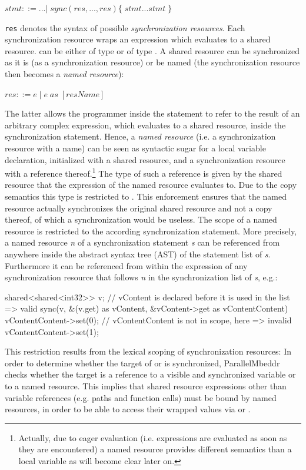$ \mathit{stmt} ::= ...
        |\;\mathit{sync}(res, ..., res) \{\;\mathit{stmt} ... \mathit{stmt}\;\}$
        
\texttt{res} denotes the syntax of possible \textit{synchronization resources}. Each synchronization resource  wraps an expression  which evaluates to a shared resource.  can be either of type  or of type . A shared resource can be synchronized as it is (as a synchronization resource) or be named (the synchronization resource then becomes a \textit{named resource}):

$ res ::= e\;|\;e\;\mathit{as}\;[\mathit{resName}] $

The latter allows the programmer inside the  statement to refer to the result of an arbitrary complex expression, which evaluates to a shared resource, inside the synchronization statement. Hence, a \textit{named resource} (i.e. a synchronization resource with a name) can be seen as syntactic sugar for a local variable declaration, initialized with a shared resource, and a synchronization resource with a reference thereof.\footnote{Actually, due to eager evaluation (i.e. expressions are evaluated as soon as they are encountered) a named resource provides different semantics than a local variable as will become clear later on.} The type of such a reference is given by the shared resource that the expression of the named resource evaluates to. Due to the copy semantics this type is restricted to . This enforcement ensures that the named resource actually synchronizes the original shared resource and not a copy thereof, of which a synchronization would be useless. The scope of a named resource is restricted to the according synchronization statement. More precisely, a named resource \textit{n} of a synchronization statement \textit{s} can be referenced from anywhere inside the abstract syntax tree (AST) of the statement list of \textit{s}. Furthermore it can be referenced from within the expression of any synchronization resource that follows \textit{n} in the synchronization list of \textit{s}, e.g.:
\begin{ccode}
shared<shared<int32>> v;
// vContent is declared before it is used in the list => valid
sync(v, &(v.get) as vContent, &vContent->get as vContentContent) {
  vContentContent->set(0);
}
// vContentContent is not in scope, here => invalid
vContentContent->set(1);
\end{ccode}

This restriction results from the lexical scoping of synchronization resources: In order to determine whether the target of  or  is synchronized, ParallelMbeddr checks whether the target is a reference to a visible and synchronized variable or to a named resource. This implies that shared resource expressions other than variable references (e.g. paths and function calls) must be bound by named resources, in order to be able to access their wrapped values via  or . 

